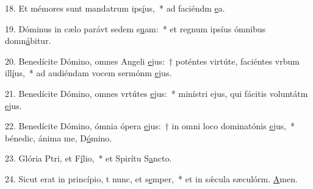 18. Et mémores sunt mandatrum ips\uline{í}us,~* ad faciéndm \uline{e}a.\par 
19. Dóminus in cælo parávt sedem s\uline{u}am:~* et regnum ipsíus ómnibus domn\uline{á}bitur.\par 
20. Benedícite Dómino, omnes Angeli \uline{e}jus:~† poténtes virtúte, faciéntes vrbum ill\uline{í}us,~* ad audiéndam vocem sermónm \uline{e}jus.\par 
21. Benedícite Dómino, omnes vrtútes \uline{e}jus:~* minístri ejus, qui fácitis voluntátm \uline{e}jus.\par 
22. Benedícite Dómino, ómnia ópera \uline{e}jus:~† in omni loco dominatónis \uline{e}jus,~* bénedic, ánima me, D\uline{ó}mino.\par 
23. Glória Ptri, et F\uline{í}lio,~* et Spirítu S\uline{a}ncto.\par 
24. Sicut erat in princípio, t nunc, et s\uline{e}mper,~* et in sǽcula sæculórm. \uline{A}men.\par 
